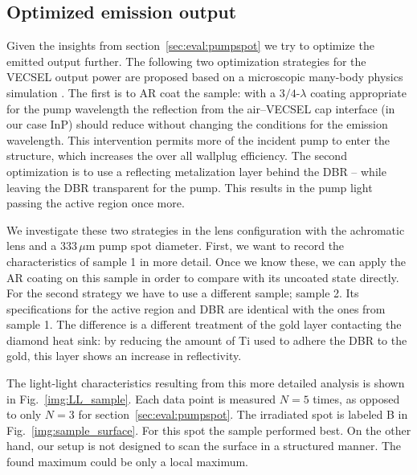 \subsection{Optimized emission output}
\label{sec:eval:maxout}

Given the insights from section~\ref{sec:eval:pumpspot}
we try to optimize the emitted output further.
The following
two optimization strategies
for the VECSEL output power
are proposed
based on a microscopic many-body physics simulation
\cite{Hader2011}.
The first is to AR coat the sample:
with a $3/4$-$\lambda$ coating
appropriate for the pump wavelength
the reflection from
the air--VECSEL cap interface
(in our case InP)
should reduce
without changing the conditions
for the emission wavelength.
This intervention
permits more of the incident pump
to enter the structure,
which increases the over all
wallplug efficiency.
The second optimization is
to use a reflecting metalization layer
behind the DBR --
while leaving the DBR transparent for the pump.
This results in
the pump light
passing the active region
once more.

We investigate these two strategies
in the lens configuration
with the achromatic lens
and a $333\,\mu\mathrm{m}$
pump spot diameter.
First,
we want to record the characteristics
of sample 1 in more detail.
Once we know these,
we can apply the AR coating
on this sample
in order to compare
with its uncoated state
directly.
For the second strategy
we have to use a different sample; sample 2.
Its specifications for the active region
and DBR are identical
with the ones from sample 1.
The difference
is a different treatment
of the gold layer
contacting the diamond heat sink:
by reducing the amount of Ti
used to adhere
the DBR to the gold,
this layer shows an increase
in reflectivity.

The light-light characteristics
resulting from this more detailed analysis
is shown in Fig.~\ref{img:LL_sample}.
Each data point
is measured $N=5$ times,
as opposed to only $N=3$
for section~\ref{sec:eval:pumpspot}.
The irradiated spot is labeled B
in Fig.~\ref{img:sample_surface}.
For this spot the sample
performed best.
On the other hand,
our setup is not designed
to scan the surface in a structured manner.
The found maximum could
be only a local maximum.

